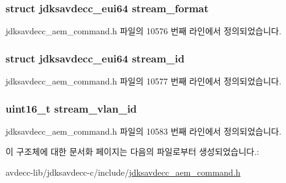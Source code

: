 \subsubsection[{\texorpdfstring{stream\+\_\+format}{stream_format}}]{\setlength{\rightskip}{0pt plus 5cm}struct {\bf jdksavdecc\+\_\+eui64} stream\+\_\+format}\hypertarget{structjdksavdecc__aem__command__set__stream__info_a77359be54ea386b1da66597746709ed0}{}\label{structjdksavdecc__aem__command__set__stream__info_a77359be54ea386b1da66597746709ed0}


jdksavdecc\+\_\+aem\+\_\+command.\+h 파일의 10576 번째 라인에서 정의되었습니다.

\subsubsection[{\texorpdfstring{stream\+\_\+id}{stream_id}}]{\setlength{\rightskip}{0pt plus 5cm}struct {\bf jdksavdecc\+\_\+eui64} stream\+\_\+id}\hypertarget{structjdksavdecc__aem__command__set__stream__info_af4c017686a11885d1d514c21bcde8160}{}\label{structjdksavdecc__aem__command__set__stream__info_af4c017686a11885d1d514c21bcde8160}


jdksavdecc\+\_\+aem\+\_\+command.\+h 파일의 10577 번째 라인에서 정의되었습니다.

\subsubsection[{\texorpdfstring{stream\+\_\+vlan\+\_\+id}{stream_vlan_id}}]{\setlength{\rightskip}{0pt plus 5cm}uint16\+\_\+t stream\+\_\+vlan\+\_\+id}\hypertarget{structjdksavdecc__aem__command__set__stream__info_a8901fae0712dfce7341cdcbe8b43035c}{}\label{structjdksavdecc__aem__command__set__stream__info_a8901fae0712dfce7341cdcbe8b43035c}


jdksavdecc\+\_\+aem\+\_\+command.\+h 파일의 10583 번째 라인에서 정의되었습니다.



이 구조체에 대한 문서화 페이지는 다음의 파일로부터 생성되었습니다.\+:\begin{DoxyCompactItemize}
\item 
avdecc-\/lib/jdksavdecc-\/c/include/\hyperlink{jdksavdecc__aem__command_8h}{jdksavdecc\+\_\+aem\+\_\+command.\+h}\end{DoxyCompactItemize}
